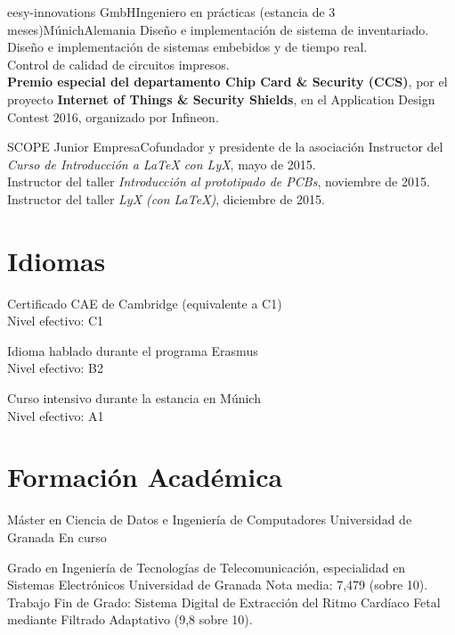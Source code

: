 \documentclass[11pt,a4paper,sans,spanish]{moderncv}
\begin{document}
{eesy-innovations GmbH}{Ingeniero en prácticas (estancia de 3 meses)}{Múnich}{Alemania}
{Diseño e implementación de sistema de inventariado.\\
Diseño e implementación de sistemas embebidos y de tiempo real.\\
Control de calidad de circuitos impresos.\\
\textbf{Premio especial del departamento Chip Card \& Security (CCS)}, por el proyecto \textbf{Internet of Things \& Security Shields}, en el Application Design Contest 2016, organizado por Infineon.}

{SCOPE Junior Empresa}{Cofundador y presidente de la asociación}{}{}
{Instructor del \emph{Curso de Introducción a LaTeX con LyX}, mayo de 2015.\\
Instructor del taller \emph{Introducción al prototipado de PCBs}, noviembre de 2015.\\
Instructor del taller \emph{LyX (con LaTeX)}, diciembre de 2015.
}


\section{Idiomas}


{Certificado CAE de Cambridge (equivalente a C1)\\Nivel efectivo: C1}

{Idioma hablado durante el programa Erasmus\\Nivel efectivo: B2}

{Curso intensivo durante la estancia en Múnich\\Nivel efectivo: A1}


\section{Formación Académica}

{Máster en Ciencia de Datos e Ingeniería de Computadores}
{Universidad de Granada}{}{}
{En curso}

{Grado en Ingeniería de Tecnologías de Telecomunicación, especialidad en Sistemas Electrónicos}
{Universidad de Granada}{}{}
{Nota media: 7,479 (sobre 10).
Trabajo Fin de Grado:
Sistema Digital de Extracción del Ritmo Cardíaco Fetal mediante Filtrado Adaptativo (9,8 sobre 10).}
\end{document}

